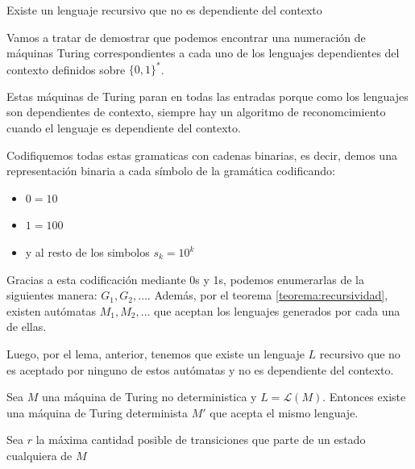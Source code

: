 \begin{lemma}
  Existe un lenguaje recursivo que no es dependiente del contexto
\end{lemma}
\begin{demo}[0.8\textwidth]
  Vamos a tratar de demostrar que podemos encontrar una numeración de máquinas Turing correspondientes a cada uno de los lenguajes dependientes del contexto definidos sobre \(\{0,1\}^*\).
\end{demo}
\begin{demoPart}[0.8\textwidth]
  Estas máquinas de Turing paran en todas las entradas porque como los lenguajes son dependientes de contexto, siempre hay un algoritmo de reconomcimiento cuando el lenguaje es dependiente del contexto.

  Codifiquemos todas estas gramaticas con cadenas binarias, es decir, demos una representación binaria a cada símbolo de la gramática codificando:

  \begin{itemize}
    \item \(0 = 10\)
    \item \(1 = 100\)
    \item y al resto de los simbolos \(s_k = 10^k\)
  \end{itemize}

  Gracias a esta codificación mediante 0s y 1s, podemos enumerarlas de la siguientes manera: \(G_1,G_2,\dots\). Además, por el teorema \ref{teorema:recursividad}, existen autómatas \(M_1, M_2,\dots\) que aceptan los lenguajes generados por cada una de ellas.

  Luego, por el lema, anterior, tenemos que existe un lenguaje \(L\) recursivo que no es aceptado por ninguno de estos autómatas y no es dependiente del contexto.
\end{demoPart}

\begin{teorema}
  Sea \(M\) una máquina de Turing no deterministica y \(L = \mathcal{L}(M)\). Entonces existe una máquina de Turing determinista \(M'\) que acepta el mismo lenguaje.
\end{teorema}

\begin{demo}[0.8\textwidth]
  Sea \(r\) la máxima cantidad posible de transiciones que parte de un estado cualquiera de \(M\)
\end{demo}